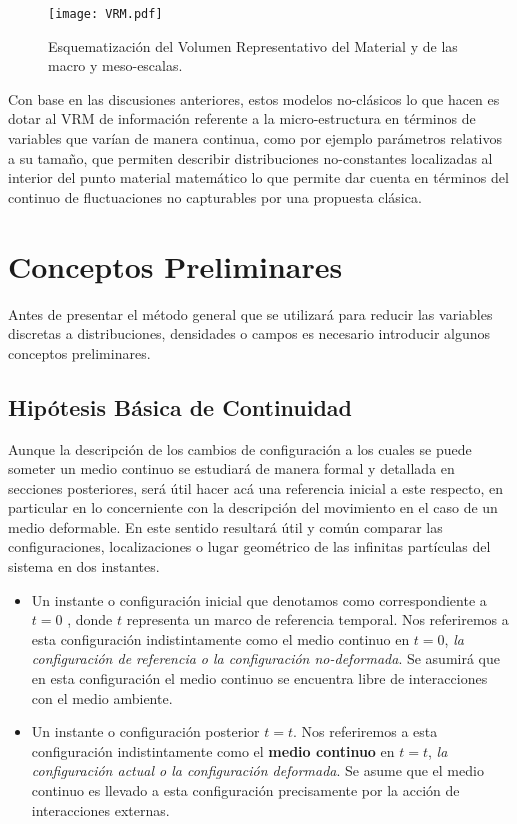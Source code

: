 \documentclass[../notas medios.tex]{subfiles}
\begin{document}
\begin{figure}[H]
\centering
	\texttt{[image: VRM.pdf]}
	\caption{Esquematización del Volumen Representativo del Material y de las macro y meso-escalas.}
	\label{VRM}
\end{figure}

Con base en las discusiones anteriores, estos modelos no-clásicos lo que hacen es dotar al VRM de información referente a la micro-estructura en términos de variables que varían de manera continua, como por ejemplo parámetros relativos a su tamaño, que permiten describir distribuciones no-constantes localizadas al interior del punto material matemático lo que permite dar cuenta en términos del continuo de fluctuaciones no capturables por una propuesta clásica.

\section{Conceptos Preliminares}
Antes de presentar el método general que se utilizará para reducir las variables discretas a distribuciones, densidades o campos es necesario introducir algunos conceptos preliminares.

\subsection{Hipótesis Básica de Continuidad}
Aunque la descripción de los cambios de configuración a los cuales se puede someter un medio continuo se estudiará de manera formal y detallada en secciones posteriores, será útil hacer acá una referencia inicial a este respecto, en particular en lo concerniente con la descripción del movimiento en el caso de un medio deformable.  En este sentido resultará útil y común comparar las configuraciones, localizaciones o lugar geométrico de las infinitas partículas del sistema en dos instantes.

\begin{itemize}
\item Un instante o configuración inicial que denotamos como correspondiente a $t=0$ , donde $t$ representa un marco de referencia temporal.  Nos referiremos a esta configuración indistintamente como el medio continuo en $t=0$, \textit{la configuración de referencia o la configuración no-deformada}.  Se asumirá que en esta configuración el medio continuo se encuentra libre de interacciones con el medio ambiente.

\item Un instante o configuración posterior $t=t$.  Nos referiremos a esta configuración indistintamente como el {\bf medio continuo} en $t=t$, \textit{la configuración actual o la configuración deformada}.  Se asume que el medio continuo es llevado a esta configuración precisamente por la acción de interacciones externas. 

\end{itemize}
\end{document}
